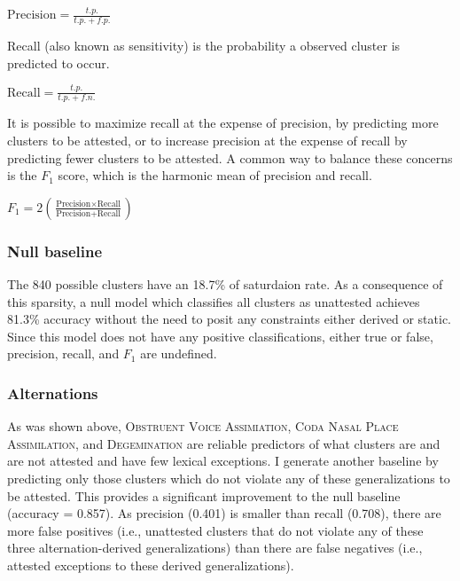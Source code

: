 \ex $\displaystyle \textrm{Precision} = \frac{t.p.}{t.p. + f.p.}$ \xe

\noindent
Recall (also known as sensitivity) is the probability a observed cluster is predicted to occur. 

\ex $\displaystyle \textrm{Recall} = \frac{t.p.}{t.p. + f.n.}$ \xe

It is possible to maximize recall at the expense of precision, by predicting more clusters to be attested, or to increase precision at the expense of recall by predicting fewer clusters to be attested. A common way to balance these concerns is the $F_1$ score, which is the harmonic mean of precision and recall.

\ex $\displaystyle F_1 = 2 \left( \frac{\textrm{Precision} \times \textrm{Recall}}{\textrm{Precision} + \textrm{Recall}}\right)$ \xe

\subsubsection{Null baseline}

The 840 possible clusters have an 18.7\% of saturdaion rate. As a consequence of this sparsity, a null model which classifies all clusters as unattested achieves 81.3\% accuracy without the need to posit any constraints either derived or static. Since this model does not have any positive classifications, either true or false, precision, recall, and $F_1$ are undefined.

\subsubsection{Alternations}

As was shown above, \textsc{Obstruent Voice Assimiation}, \textsc{Coda Nasal Place Assimilation}, and \textsc{Degemination} are reliable predictors of what clusters are and are not attested and have few lexical exceptions. I generate another baseline by predicting only those clusters which do not violate any of these generalizations to be attested. This provides a significant improvement to the null baseline (accuracy = 0.857). As precision (0.401) is smaller than recall (0.708), there are more false positives (i.e., unattested clusters that do not violate any of these three alternation-derived generalizations) than there are false negatives (i.e., attested exceptions to these derived generalizations). 

\subsubsection{\citet{Pierrehumbert1994}}


